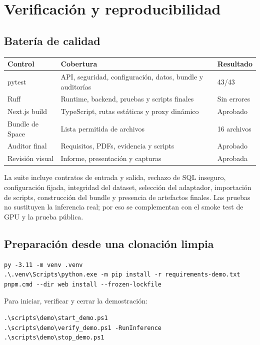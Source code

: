 \documentclass[11pt,letterpaper]{article}
\begin{document}
\section{Verificación y reproducibilidad}

\subsection{Batería de calidad}

\begin{tabularx}{\textwidth}{@{}XXl@{}}
\toprule
\textbf{Control} & \textbf{Cobertura} & \textbf{Resultado}\\
\midrule
pytest & API, seguridad, configuración, datos, bundle y auditorías & 43/43\\
Ruff & Runtime, backend, pruebas y scripts finales & Sin errores\\
Next.js build & TypeScript, rutas estáticas y proxy dinámico & Aprobado\\
Bundle de Space & Lista permitida de archivos & 16 archivos\\
Auditor final & Requisitos, PDFs, evidencia y scripts & Aprobado\\
Revisión visual & Informe, presentación y capturas & Aprobada\\
\bottomrule
\end{tabularx}

La suite incluye contratos de entrada y salida, rechazo de SQL inseguro, configuración fijada,
integridad del dataset, selección del adaptador, importación de scripts, construcción del bundle y
presencia de artefactos finales. Las pruebas no sustituyen la inferencia real; por eso se complementan
con el smoke test de GPU y la prueba pública.

\subsection{Preparación desde una clonación limpia}

\begin{verbatim}
py -3.11 -m venv .venv
.\.venv\Scripts\python.exe -m pip install -r requirements-demo.txt
pnpm.cmd --dir web install --frozen-lockfile
\end{verbatim}

Para iniciar, verificar y cerrar la demostración:

\begin{verbatim}
.\scripts\demo\start_demo.ps1
.\scripts\demo\verify_demo.ps1 -RunInference
.\scripts\demo\stop_demo.ps1
\end{verbatim}
\end{document}
